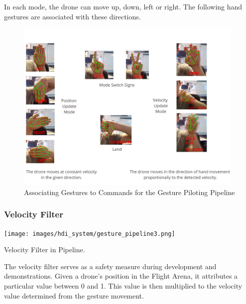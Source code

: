 \pagebreak
In each mode, the drone can move up, down, left or right. The following hand gestures are associated with these directions.

\begin{figure}[h]
    \raggedright
    \includegraphics[width=11cm]{images/hand_drone_interaction/pose_association_white.png}
    \caption{Associating Gestures to Commands for the Gesture Piloting Pipeline}
    \label{fig:drone_dataset}
\end{figure}

\subsubsection{Velocity Filter}

\begin{marginfigure}%
  \texttt{[image: images/hdi\_system/gesture\_pipeline3.png]}
  \caption{Velocity Filter in Pipeline.}
  \label{fig:gestures_velocity}
\end{marginfigure}

The velocity filter serves as a safety measure during development and demonstrations. Given a drone's position in the Flight Arena, it attributes a particular value between 0 and 1. This value is then multiplied to the velocity value determined from the gesture movement. 


